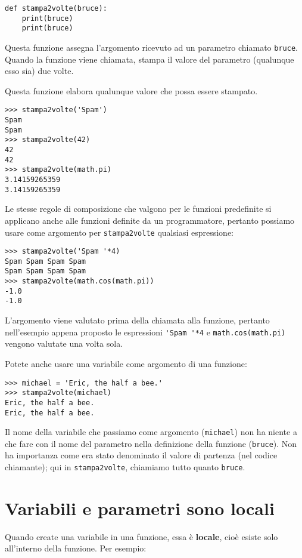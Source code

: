\documentclass[10pt]{book}
\begin{document}
\begin{verbatim}
def stampa2volte(bruce):
    print(bruce)
    print(bruce)
\end{verbatim}
%
Questa funzione assegna l'argomento ricevuto ad un parametro chiamato {\tt bruce}. Quando la funzione viene chiamata, stampa il valore del parametro (qualunque esso sia) due volte.

Questa funzione elabora qualunque valore che possa essere stampato.

\begin{verbatim}
>>> stampa2volte('Spam')
Spam
Spam
>>> stampa2volte(42)
42
42
>>> stampa2volte(math.pi)
3.14159265359
3.14159265359
\end{verbatim}
%
Le stesse regole di composizione che valgono per le funzioni predefinite si applicano anche alle funzioni definite da un programmatore, pertanto possiamo usare come argomento per \verb"stampa2volte" qualsiasi espressione:

\begin{verbatim}
>>> stampa2volte('Spam '*4)
Spam Spam Spam Spam
Spam Spam Spam Spam
>>> stampa2volte(math.cos(math.pi))
-1.0
-1.0
\end{verbatim}
%
L'argomento viene valutato prima della chiamata alla funzione, pertanto nell'esempio appena proposto le espressioni \verb"'Spam '*4" e
{\tt math.cos(math.pi)} vengono valutate una volta sola.

Potete anche usare una variabile come argomento di una funzione:

\begin{verbatim}
>>> michael = 'Eric, the half a bee.'
>>> stampa2volte(michael)
Eric, the half a bee.
Eric, the half a bee.
\end{verbatim}
%
Il nome della variabile che passiamo come argomento ({\tt michael}) non ha niente a che fare con il nome del parametro nella definizione della funzione ({\tt bruce}).  Non ha importanza come era stato denominato il valore di partenza (nel codice chiamante); qui in \verb"stampa2volte", chiamiamo tutto quanto {\tt bruce}.


\section{Variabili e parametri sono locali}

Quando create una variabile in una funzione, essa è {\bf locale},
cioè esiste solo all'interno della funzione. Per esempio:
\end{document}
